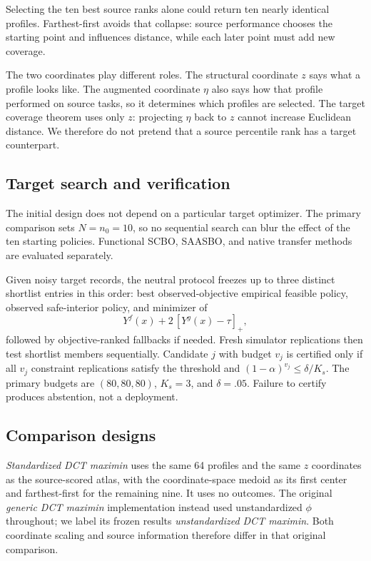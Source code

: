 Selecting the ten best source ranks alone could return ten nearly identical
profiles.  Farthest-first avoids that collapse: source performance chooses the
starting point and influences distance, while each later point must add new
coverage.

The two coordinates play different roles.  The structural coordinate $z$
says what a profile looks like.  The augmented coordinate $\eta$ also says how
that profile performed on source tasks, so it determines which profiles are
selected.  The target coverage theorem uses only $z$: projecting $\eta$ back
to $z$ cannot increase Euclidean distance.  We therefore do not pretend that
a source percentile rank has a target counterpart.


\subsection{Target search and verification}

The initial design does not depend on a particular target optimizer.  The
primary comparison sets $N=n_0=10$, so no sequential search can blur the
effect of the ten starting policies.  Functional SCBO, SAASBO, and native
transfer methods are evaluated separately.

Given noisy target records, the neutral protocol freezes up to three distinct
shortlist entries in this order: best observed-objective empirical feasible
policy, observed safe-interior policy, and minimizer of
\begin{equation}\label{eq:empirical-risk}
 Y^f(x)+2\,[Y^g(x)-\tau]_+,
\end{equation}
followed by objective-ranked fallbacks if needed.  Fresh simulator replications
then test shortlist members sequentially.  Candidate $j$ with budget $v_j$ is
certified only if all $v_j$ constraint replications satisfy the threshold and
$(1-\alpha)^{v_j}\le\delta/K_s$.  The primary budgets are $(80,80,80)$,
$K_s=3$, and $\delta=.05$.  Failure to certify produces abstention, not a
deployment.

\subsection{Comparison designs}\label{sec:comparison-designs}

\emph{Standardized DCT maximin} uses the same 64 profiles and the same $z$
coordinates as the source-scored atlas, with the coordinate-space medoid as
its first center and farthest-first for the remaining nine.  It uses no
outcomes.  The original \emph{generic DCT maximin} implementation instead used
unstandardized $\phi$ throughout; we label its frozen results
\emph{unstandardized DCT maximin}.  Both coordinate scaling and source
information therefore differ in that original comparison.

